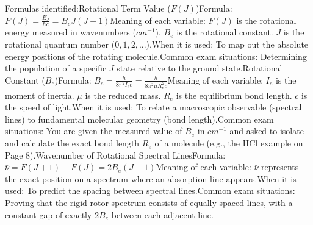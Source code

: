 \documentclass[11pt, a4paper]{report}
\begin{document}
Formulas identified:Rotational Term Value ($F(J)$)Formula: $F(J) = \frac{E_J}{hc} = B_e J(J+1)$Meaning of each variable: $F(J)$ is the rotational energy measured in wavenumbers ($cm^{-1}$). $B_e$ is the rotational constant. $J$ is the rotational quantum number ($0, 1, 2, ...$).When it is used: To map out the absolute energy positions of the rotating molecule.Common exam situations: Determining the population of a specific $J$ state relative to the ground state.Rotational Constant ($B_e$)Formula: $B_e = \frac{h}{8\pi^2 I_e c} = \frac{h}{8\pi^2 \mu R_e^2 c}$Meaning of each variable: $I_e$ is the moment of inertia. $\mu$ is the reduced mass. $R_e$ is the equilibrium bond length. $c$ is the speed of light.When it is used: To relate a macroscopic observable (spectral lines) to fundamental molecular geometry (bond length).Common exam situations: You are given the measured value of $B_e$ in $cm^{-1}$ and asked to isolate and calculate the exact bond length $R_e$ of a molecule (e.g., the HCl example on Page 8).Wavenumber of Rotational Spectral LinesFormula: $\bar{\nu} = F(J+1) - F(J) = 2B_e(J+1)$Meaning of each variable: $\bar{\nu}$ represents the exact position on a spectrum where an absorption line appears.When it is used: To predict the spacing between spectral lines.Common exam situations: Proving that the rigid rotor spectrum consists of equally spaced lines, with a constant gap of exactly $2B_e$ between each adjacent line.
\end{document}
